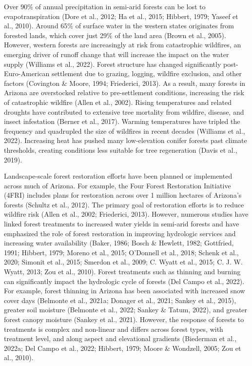 \documentclass[
]{agujournal2019}
\begin{document}
Over 90\% of annual precipitation in semi-arid forests can be lost to
evapotranspiration (Dore et al., 2012; Ha et al., 2015; Hibbert, 1979;
Yaseef et al., 2010). Around 65\% of surface water in the western states
originates from forested lands, which cover just 29\% of the land area
(Brown et al., 2005). However, western forests are increasingly at risk
from catastrophic wildfires, an emerging driver of runoff change that
will increase the impact on the water supply (Williams et al., 2022).
Forest structure has changed significantly post-Euro-American settlement
due to grazing, logging, wildfire exclusion, and other factors
(Covington \& Moore, 1994; Friederici, 2013). As a result, many forests
in Arizona are overstocked relative to pre-settlement conditions,
increasing the risk of catastrophic wildfire (Allen et al., 2002).
Rising temperatures and related droughts have contributed to extensive
tree mortality from wildfire, disease, and insect infestation (Berner et
al., 2017). Warming temperatures have tripled the frequency and
quadrupled the size of wildfires in recent decades (Williams et al.,
2022). Increasing heat has pushed many low-elevation conifer forests
past climate thresholds, creating conditions less suitable for tree
regeneration (Davis et al., 2019).

Landscape-scale forest restoration efforts have been planned or
implemented across much of Arizona. For example, the Four Forest
Restoration Initiative (4FRI) includes plans for restoration across over
1 million hectares of Arizona's forests (Schultz et al., 2012). The
primary goal of restoration efforts is to reduce wildfire risk (Allen et
al., 2002; Friederici, 2013). However, numerous studies have linked
forest treatments to increased water yields in semi-arid forests and
have emphasized the role of forest restoration in improving hydrologic
services and increasing water availability (Baker, 1986; Bosch \&
Hewlett, 1982; Gottfried, 1991; Hibbert, 1979; Moreno et al., 2015;
O'Donnell et al., 2018; Schenk et al., 2020; Simonit et al., 2015;
Smerdon et al., 2009; C. Wyatt et al., 2015; C. J. W. Wyatt, 2013; Zou
et al., 2010). Forest treatments such as thinning and burning can
significantly impact the hydrologic cycle of forests (Del Campo et al.,
2022). For example, forest thinning in Arizona has been associated with
increased snow cover days (Belmonte et al., 2021a; Donager et al., 2021;
Sankey et al., 2015), greater soil moisture (Belmonte et al., 2022;
Sankey \& Tatum, 2022), and greater forest canopy moisture (Sankey et
al., 2021). However, the response of forests to treatments is complex
and non-linear and differs across forest types, with treatment level,
and along aspect and elevational gradients (Biederman et al., 2022a; Del
Campo et al., 2022; Hibbert, 1979; Moore \& Wondzell, 2005; Zou et al.,
2010).
\end{document}

